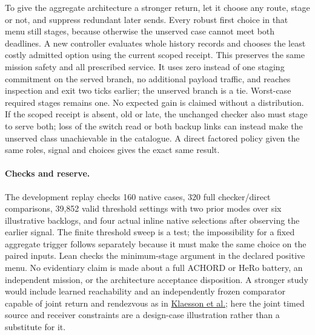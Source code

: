 \documentclass[11pt]{article}
\begin{document}
To give the aggregate architecture a stronger return, let it
choose any route, stage or not, and suppress redundant later sends.
Every robust first choice in that menu still stages, because
otherwise the unserved case cannot meet both deadlines. A
new controller evaluates whole history records and chooses the
least costly admitted option using the current scoped receipt.
This preserves the same mission safety and all prescribed service.
It uses zero instead of one staging commitment on the served
branch, no additional payload traffic, and reaches inspection
and exit two ticks earlier; the unserved branch is a tie.
Worst-case required stages remains one. No expected gain is
claimed without a distribution. If the scoped receipt is absent,
old or late, the unchanged checker also must stage to serve both;
loss of the switch read or both backup links can instead make
the unserved class unachievable in the catalogue. A direct
factored policy given the same roles, signal and choices gives
the exact same result.

\paragraph{Checks and reserve.}
The development replay checks 160 native cases, 320 full
checker/direct comparisons, 39,852 valid threshold settings
with two prior modes over six illustrative backlogs, and four
actual inline native selections after observing the earlier
signal. The finite threshold sweep is a test; the impossibility
for a fixed aggregate trigger follows separately because it
must make the same choice on the paired inputs. Lean checks the
minimum-stage argument in the declared positive menu. No
evidentiary claim is made about a full ACHORD or HeRo battery,
an independent mission, or the architecture acceptance
disposition. A stronger study would include learned reachability
and an independently frozen comparator capable of joint return
and rendezvous as in
\href{https://ntrs.nasa.gov/citations/20220001447}{Klaesson et al.};
here the joint timed source and receiver constraints are a
design-case illustration rather than a substitute for it.
\end{document}
